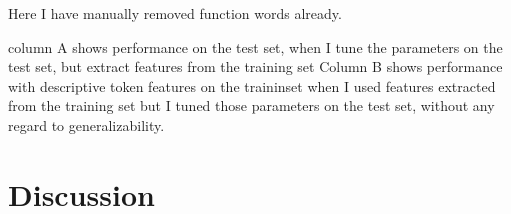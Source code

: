 \documentclass{article}
\begin{document}
Here I have manually removed function words already.

column A shows performance on the test set,
when I tune the parameters on the test set, but extract
features from the training set
Column B shows performance with descriptive token features on the traininset
when I used features extracted from the training set but I tuned
those parameters on the test set, without any regard to generalizability.



\section{Discussion}
\label{sec:discussion}



\end{document}

